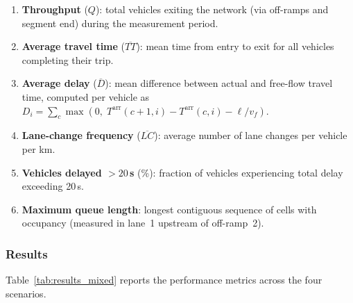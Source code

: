 \documentclass[review,authoryear]{elsarticle}
\newcommand{\Tarr}{T^{\text{arr}}}
\begin{document}
\begin{enumerate}
    \item \textbf{Throughput} ($Q$): total vehicles exiting the network (via off-ramps and segment end) during the measurement period.
    \item \textbf{Average travel time} ($\overline{TT}$): mean time from entry to exit for all vehicles completing their trip.
    \item \textbf{Average delay} ($\overline{D}$): mean difference between actual and free-flow travel time, computed per vehicle as $D_i = \sum_{c} \max(0,\; \Tarr(c+1,i) - \Tarr(c,i) - \ell/v_f)$.
    \item \textbf{Lane-change frequency} ($\overline{LC}$): average number of lane changes per vehicle per km.
    \item \textbf{Vehicles delayed $> 20$\,s} (\%): fraction of vehicles experiencing total delay exceeding 20\,s.
    \item \textbf{Maximum queue length}: longest contiguous sequence of cells with occupancy (measured in lane~1 upstream of off-ramp~2).
\end{enumerate}

\subsubsection{Results}

Table~\ref{tab:results_mixed} reports the performance metrics across the four scenarios.
\end{document}
